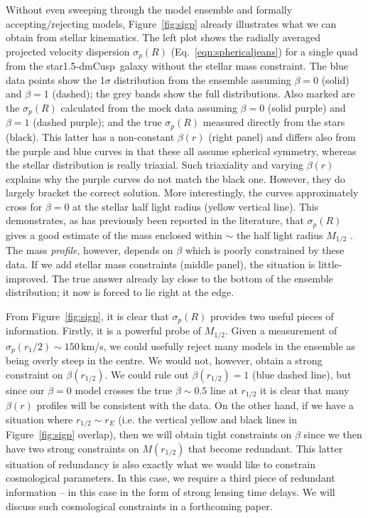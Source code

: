 \documentclass[galley,usenatbib]{mn2e}
\newcommand{\figref}[1] {Figure~\ref{#1}}
\newcommand{\eqnrefp}[1] {(Eq.~\ref{#1})}
\newcommand{\mockBC}{{\sc star1.5-dmCusp}}
\begin{document}
Without even sweeping through the model ensemble and formally
accepting/rejecting models, \figref{fig:sigp} already illustrates what we can obtain from stellar kinematics. The left plot shows the radially averaged projected velocity dispersion $\sigma_p(R)$ \eqnrefp{eqn:sphericaljeans} for a single quad from the \mockBC\ galaxy without the stellar mass constraint. The blue data points show the 1$\sigma$ distribution from the ensemble assuming $\beta=0$ (solid) and $\beta = 1$ (dashed); the grey bands show the full distributions. Also marked are the $\sigma_p(R)$ calculated from the mock data assuming $\beta=0$ (solid purple) and $\beta =1$ (dashed purple); and the true $\sigma_p(R)$ measured directly from the stars (black). This latter has a non-constant $\beta(r)$ (right panel) and differs also from the purple and blue curves in that these all assume spherical symmetry, whereas the stellar distribution is really triaxial. Such triaxiality and varying $\beta(r)$ explains why the purple curves do not match the black one. However, they do largely bracket the correct solution. More interestingly, the curves approximately cross for $\beta = 0$ at the stellar half light radius (yellow vertical line). This demonstrates, as has previously been reported in the literature, that $\sigma_p(R)$ gives a good estimate of the mass enclosed within $\sim$ the half light radius $M_{1/2}$ \citep[e.g.][]{2009ApJ...704.1274W,2010MNRAS.406.1220W}. The mass {\it profile}, however, depends on $\beta$ which is poorly constrained by these data. If we add stellar mass constraints (middle panel), the situation is little-improved. The true answer already lay close to the bottom of the ensemble distribution; it now is forced to lie right at the edge. 

From \figref{fig:sigp}, it is clear that $\sigma_p(R)$ provides two useful pieces of information. Firstly, it is a powerful probe of $M_{1/2}$. Given a measurement of $\sigma_p(r_1/2) \sim 150$\,km/s, we could usefully reject many models in the ensemble as being overly steep in the centre. We would not, however, obtain a strong constraint on $\beta(r_{1/2})$. We could rule out $\beta(r_{1/2}) = 1$ (blue dashed line), but since our $\beta=0$ model crosses the true $\beta \sim 0.5$ line at $r_{1/2}$ it is clear that many $\beta(r)$ profiles will be consistent with the data. On the other hand, if we have a situation where $r_{1/2} \sim r_E$ (i.e. the vertical yellow and black lines in \figref{fig:sigp} overlap), then we will obtain tight constraints on $\beta$ since we then have two strong constraints on $M(r_{1/2})$ that become redundant. This latter situation of redundancy is also exactly what we would like to constrain cosmological parameters. In this case, we require a third piece of redundant information -- in this case in the form of strong lensing time delays. We will discuss such cosmological constraints in a forthcoming paper. 
\end{document}

